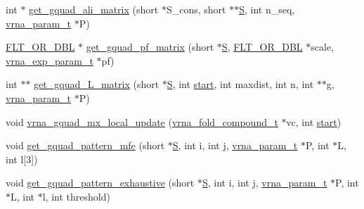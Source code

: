 \begin{DoxyCompactItemize}
int $\ast$ \mbox{\hyperlink{group__gquads_gab30685e61b49bbb2c6b5a4b8e87749fe}{get\+\_\+gquad\+\_\+ali\+\_\+matrix}} (short $\ast$S\+\_\+cons, short $\ast$$\ast$\mbox{\hyperlink{group__energy__parameters__rw_gga7bf2bb363bcf5ce50d60255d256e5682af1ce01387d2348f8b858721a7db81670}{S}}, int n\+\_\+seq, \mbox{\hyperlink{group__energy__parameters_ga8a69ca7d787e4fd6079914f5343a1f35}{vrna\+\_\+param\+\_\+t}} $\ast$P)
\item 
\mbox{\hyperlink{group__data__structures_ga31125aeace516926bf7f251f759b6126}{F\+L\+T\+\_\+\+O\+R\+\_\+\+D\+BL}} $\ast$ \mbox{\hyperlink{group__gquads_ga286fa5dfce69c0f383c469d4147d9634}{get\+\_\+gquad\+\_\+pf\+\_\+matrix}} (short $\ast$\mbox{\hyperlink{group__energy__parameters__rw_gga7bf2bb363bcf5ce50d60255d256e5682af1ce01387d2348f8b858721a7db81670}{S}}, \mbox{\hyperlink{group__data__structures_ga31125aeace516926bf7f251f759b6126}{F\+L\+T\+\_\+\+O\+R\+\_\+\+D\+BL}} $\ast$scale, \mbox{\hyperlink{group__energy__parameters_ga01d8b92fe734df8d79a6169482c7d8d8}{vrna\+\_\+exp\+\_\+param\+\_\+t}} $\ast$pf)
\item 
int $\ast$$\ast$ \mbox{\hyperlink{group__gquads_gaed52d05fbe10e771daa2593d2d935937}{get\+\_\+gquad\+\_\+\+L\+\_\+matrix}} (short $\ast$\mbox{\hyperlink{group__energy__parameters__rw_gga7bf2bb363bcf5ce50d60255d256e5682af1ce01387d2348f8b858721a7db81670}{S}}, int \mbox{\hyperlink{special__const_8h_ab53016e6941484f46238d59e2549decb}{start}}, int maxdist, int n, int $\ast$$\ast$g, \mbox{\hyperlink{group__energy__parameters_ga8a69ca7d787e4fd6079914f5343a1f35}{vrna\+\_\+param\+\_\+t}} $\ast$P)
\item 
void \mbox{\hyperlink{group__gquads_gad09a24800f11f53c2dbc65b945ec956e}{vrna\+\_\+gquad\+\_\+mx\+\_\+local\+\_\+update}} (\mbox{\hyperlink{group__fold__compound_ga1b0cef17fd40466cef5968eaeeff6166}{vrna\+\_\+fold\+\_\+compound\+\_\+t}} $\ast$vc, int \mbox{\hyperlink{special__const_8h_ab53016e6941484f46238d59e2549decb}{start}})
\item 
void \mbox{\hyperlink{group__gquads_ga4be64833bd2692a91c7454bb8f17c622}{get\+\_\+gquad\+\_\+pattern\+\_\+mfe}} (short $\ast$\mbox{\hyperlink{group__energy__parameters__rw_gga7bf2bb363bcf5ce50d60255d256e5682af1ce01387d2348f8b858721a7db81670}{S}}, int i, int j, \mbox{\hyperlink{group__energy__parameters_ga8a69ca7d787e4fd6079914f5343a1f35}{vrna\+\_\+param\+\_\+t}} $\ast$P, int $\ast$L, int l\mbox{[}3\mbox{]})
\item 
void \mbox{\hyperlink{group__gquads_gae72088f0c674df7ac1c650c8bf02fad8}{get\+\_\+gquad\+\_\+pattern\+\_\+exhaustive}} (short $\ast$\mbox{\hyperlink{group__energy__parameters__rw_gga7bf2bb363bcf5ce50d60255d256e5682af1ce01387d2348f8b858721a7db81670}{S}}, int i, int j, \mbox{\hyperlink{group__energy__parameters_ga8a69ca7d787e4fd6079914f5343a1f35}{vrna\+\_\+param\+\_\+t}} $\ast$P, int $\ast$L, int $\ast$l, int threshold)
$$
\end{DoxyCompactItemize}
